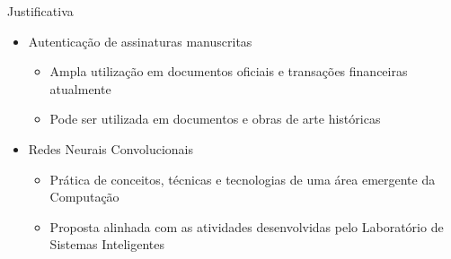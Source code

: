 
\begin{frame}{Justificativa}
	\begin{itemize}
		\item Autenticação de assinaturas manuscritas
		\begin{itemize}
			\item Ampla utilização em \alert{documentos oficiais} e \alert{transações financeiras} atualmente
			\item Pode ser utilizada em documentos e obras de arte históricas
		\end{itemize}
		\bigskip
		\item Redes Neurais Convolucionais
		\begin{itemize}
			\item Prática de conceitos, técnicas e tecnologias de uma área emergente da Computação
			\item Proposta alinhada com as atividades desenvolvidas pelo \alert{Laboratório de Sistemas Inteligentes}
		\end{itemize}
	\end{itemize}
\end{frame}
